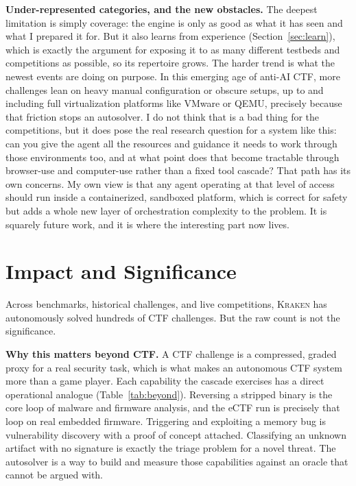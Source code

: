 \documentclass[10pt,twocolumn]{article}
\newcommand{\kraken}{\textsc{Kraken}}
\begin{document}
\medskip
\textbf{Under-represented categories, and the new obstacles.} The deepest limitation is simply coverage: the
engine is only as good as what it has seen and what I prepared it for. But it also learns from experience
(Section~\ref{sec:learn}), which is exactly the argument for exposing it to as many different testbeds and
competitions as possible, so its repertoire grows. The harder trend is what the newest events are doing on
purpose. In this emerging age of anti-AI CTF, more challenges lean on heavy manual configuration or obscure
setups, up to and including full virtualization platforms like VMware or QEMU, precisely because that
friction stops an autosolver. I do not think that is a bad thing for the competitions, but it does pose
the real research question for a system like this: can you give the agent all the resources and guidance it
needs to work through those environments too, and at what point does that become tractable through browser-use
and computer-use rather than a fixed tool cascade? That path has its own concerns. My own view is that any
agent operating at that level of access should run inside a containerized, sandboxed platform, which is
correct for safety but adds a whole new layer of orchestration complexity to the problem. It is squarely
future work, and it is where the interesting part now lives.

\section{Impact and Significance}
\label{sec:impact}

Across benchmarks, historical challenges, and live competitions, \kraken{} has autonomously solved hundreds
of CTF challenges. But the raw count is not the significance.

\medskip
\textbf{Why this matters beyond CTF.} A CTF challenge is a compressed, graded proxy for a real security task,
which is what makes an autonomous CTF system more than a game player. Each capability the cascade exercises has
a direct operational analogue (Table~\ref{tab:beyond}). Reversing a stripped binary is the core loop of malware
and firmware analysis, and the eCTF run is precisely that loop on real embedded firmware. Triggering and
exploiting a memory bug is vulnerability discovery with a proof of concept attached. Classifying an unknown
artifact with no signature is exactly the triage problem for a novel threat. The autosolver is a way to build
and measure those capabilities against an oracle that cannot be argued with.
\end{document}

